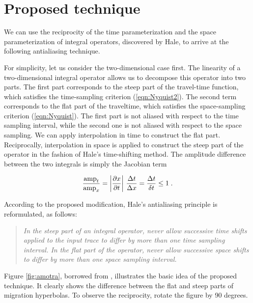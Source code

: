 \section{Proposed technique}
We can use the reciprocity of the time parameterization and the space
parameterization of integral operators, discovered by Hale, to arrive
at the following antialiasing technique.

For simplicity, let us consider the two-dimensional case first.  The
linearity of a two-dimensional integral operator allows us to
decompose this operator into two parts. The first part corresponds to
the steep part of the travel-time function, which satisfies the
time-sampling criterion (\ref{eqn:Nyquist2}). The second term
corresponds to the flat part of the traveltime, which satisfies the
space-sampling criterion (\ref{eqn:Nyquist}). The first part is not
aliased with respect to the time sampling interval, while the second
one is not aliased with respect to the space sampling. We can apply
interpolation in time to construct the flat part.  Reciprocally,
interpolation in space is applied to construct the steep part of the
operator in the fashion of Hale's time-shifting method. 
The amplitude
difference between the two integrals is simply the Jacobian term

\begin{equation}
{\mbox{amp}_t \over \mbox{amp}_x}=
\left|{\partial x \over \partial t}\right|\,{\Delta t \over \Delta x}=
{\Delta t \over \delta t} \leq 1\;.
\label{eqn:Jacobian}
\end{equation}

According to the proposed modification, Hale's antialiasing principle
is reformulated, as follows:
\begin{quote}
{\em In the steep part of an integral operator, never allow successive
time shifts applied to the input trace to differ by more than one time
sampling interval. In the flat part of the operator, never allow
successive space shifts to differ by more than one space sampling
interval.}
\end{quote}


Figure \ref{fig:amotra}, borrowed from \cite{Claerbout.bei.95},
illustrates the basic idea of the proposed technique. It clearly shows
the difference between the flat and steep parts of migration
hyperbolas. To observe the reciprocity, rotate the figure by 90
degrees.

